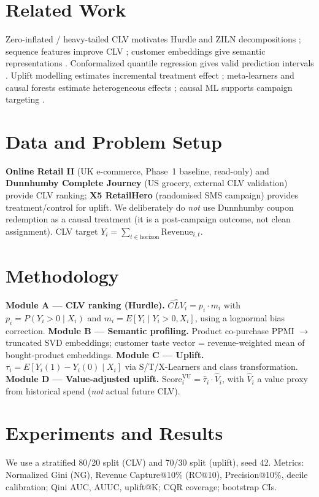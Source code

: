\documentclass[11pt]{article}
\begin{document}
\section{Related Work}
Zero-inflated / heavy-tailed CLV motivates Hurdle and ZILN decompositions \citep{cragg1971hurdle,
wang2019deep}; sequence features improve CLV \citep{bauer2021improved}; customer embeddings give
semantic representations \citep{chamberlain2017customer}. Conformalized quantile regression gives
valid prediction intervals \citep{romano2019cqr}. Uplift modelling estimates incremental treatment
effect \citep{gutierrez2017uplift}; meta-learners and causal forests estimate heterogeneous
effects \citep{kunzel2019metalearners,wager2018causalforest}; causal ML supports campaign
targeting \citep{gubela2024multiple,fader2005rfm}.

\section{Data and Problem Setup}
\textbf{Online Retail II} (UK e-commerce, Phase~1 baseline, read-only) and \textbf{Dunnhumby
Complete Journey} (US grocery, external CLV validation) provide CLV ranking; \textbf{X5
RetailHero} (randomised SMS campaign) provides treatment/control for uplift. We deliberately do
\emph{not} use Dunnhumby coupon redemption as a causal treatment (it is a post-campaign outcome,
not clean assignment). CLV target $Y_i=\sum_{t\in\text{horizon}}\text{Revenue}_{i,t}$.

\section{Methodology}
\textbf{Module A --- CLV ranking (Hurdle).} $\widehat{CLV}_i=p_i\cdot m_i$ with
$p_i=P(Y_i>0\mid X_i)$ and $m_i=E[Y_i\mid Y_i>0,X_i]$, using a lognormal bias correction.
\textbf{Module B --- Semantic profiling.} Product co-purchase PPMI $\to$ truncated SVD
embeddings; customer taste vector = revenue-weighted mean of bought-product embeddings.
\textbf{Module C --- Uplift.} $\tau_i=E[Y_i(1)-Y_i(0)\mid X_i]$ via S/T/X-Learners and class
transformation. \textbf{Module D --- Value-adjusted uplift.}
$\text{Score}^{\text{VU}}_i=\hat\tau_i\cdot\hat V_i$, with $\hat V_i$ a value proxy from
historical spend (\emph{not} actual future CLV).

\section{Experiments and Results}
We use a stratified 80/20 split (CLV) and 70/30 split (uplift), seed 42. Metrics: Normalized
Gini (NG), Revenue Capture@10\% (RC@10), Precision@10\%, decile calibration; Qini AUC, AUUC,
uplift@K; CQR coverage; bootstrap CIs.
\end{document}
